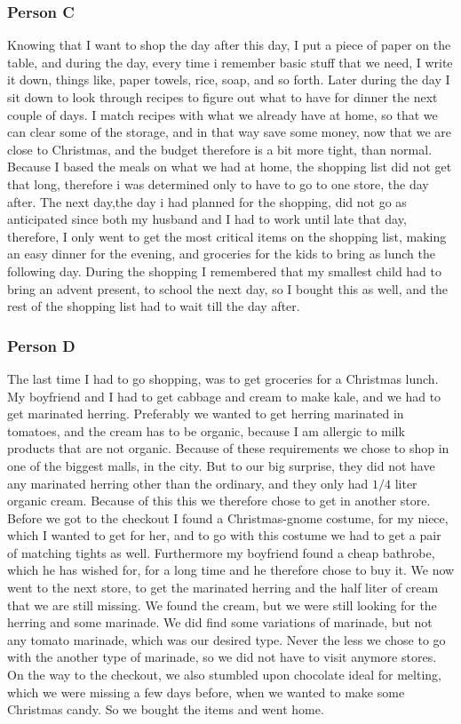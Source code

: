 \subsubsection{Person C}
Knowing that I want to shop the day after this day, I put a piece of paper on the table, and during the day, every time i remember basic stuff that we need, I write it down, things like, paper towels, rice, soap, and so forth. Later during the day I sit down to look through recipes to figure out what to have for dinner the next couple of days. I match recipes with what we already have at home, so that we can clear some of the storage, and in that way save some money, now that we are close to Christmas, and the budget therefore is a bit more tight, than normal. Because I based the meals on what we had at home, the shopping list did not get that long, therefore i was determined only to have to go to one store, the day after. The next day,the day i had planned for the shopping, did not go as anticipated since both my husband and I had to work until late that day, therefore, I only went to get the most critical items on the shopping list, making an easy dinner for the evening, and groceries for the kids to bring as lunch the following day. During the shopping I remembered that my smallest child had to bring an advent present, to school the next day, so I bought this as well, and the rest of the shopping list had to wait till the day after.

\subsubsection{Person D}
The last time I had to go shopping, was to get groceries for a Christmas lunch. My boyfriend and I had to get cabbage and cream to make kale, and we had to get marinated herring. Preferably we wanted to get herring marinated in tomatoes, and the cream has to be organic, because I am allergic to milk products that are not organic. Because of these requirements we chose to shop in one of the biggest malls, in the city. But to our big surprise, they did not have any marinated herring other than the ordinary, and they only had $1/4$ liter organic cream. Because of this this we therefore chose to get in another store. Before we got to the checkout I found a Christmas-gnome costume, for my niece, which I wanted to get for her, and to go with this costume we had to get a pair of matching tights as well. Furthermore my boyfriend found a cheap bathrobe, which he has wished for, for a long time and he therefore chose to buy it. We now went to the next store, to get the marinated herring and the half liter of cream that we are still missing. We found the cream, but we were still looking for the herring and some marinade. We did find some variations of marinade, but not any tomato marinade, which was our desired type. Never the less we chose to go with the another type of marinade, so we did not have to visit anymore stores. On the way to the checkout, we also stumbled upon chocolate ideal for melting, which we were missing a few days before, when we wanted to make some Christmas candy. So we bought the items and went home.

